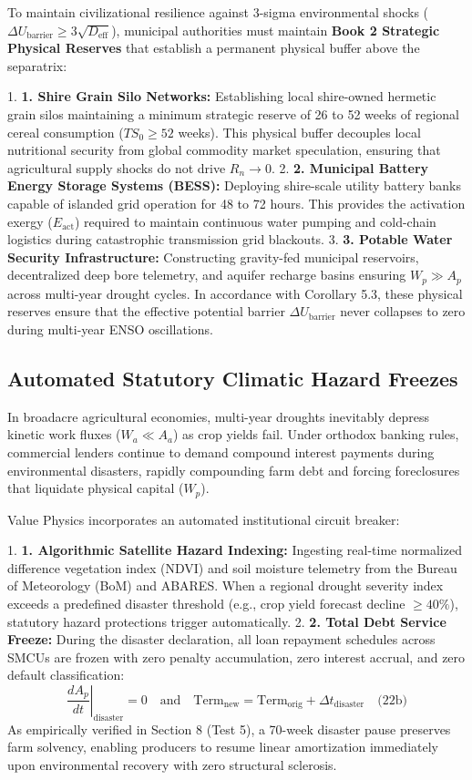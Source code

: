 \documentclass[preprint,12pt,authoryear]{elsarticle}
\theoremstyle{definition}
\begin{document}
To maintain civilizational resilience against 3-sigma environmental shocks ($\Delta U_{\text{barrier}} \ge 3 \sqrt{D_{\text{eff}}}$), municipal authorities must maintain \textbf{Book 2 Strategic Physical Reserves} that establish a permanent physical buffer above the separatrix:

1.  \textbf{1. Shire Grain Silo Networks:} Establishing local shire-owned hermetic grain silos maintaining a minimum strategic reserve of 26 to 52 weeks of regional cereal consumption ($TS_0 \ge 52$ weeks). This physical buffer decouples local nutritional security from global commodity market speculation, ensuring that agricultural supply shocks do not drive $R_n \to 0$.
2.  \textbf{2. Municipal Battery Energy Storage Systems (BESS):} Deploying shire-scale utility battery banks capable of islanded grid operation for 48 to 72 hours. This provides the activation exergy ($E_{\text{act}}$) required to maintain continuous water pumping and cold-chain logistics during catastrophic transmission grid blackouts.
3.  \textbf{3. Potable Water Security Infrastructure:} Constructing gravity-fed municipal reservoirs, decentralized deep bore telemetry, and aquifer recharge basins ensuring $W_p \gg A_p$ across multi-year drought cycles. In accordance with Corollary 5.3, these physical reserves ensure that the effective potential barrier $\Delta U_{\text{barrier}}$ never collapses to zero during multi-year ENSO oscillations.

\subsection{Automated Statutory Climatic Hazard Freezes}

In broadacre agricultural economies, multi-year droughts inevitably depress kinetic work fluxes ($W_a \ll A_a$) as crop yields fail. Under orthodox banking rules, commercial lenders continue to demand compound interest payments during environmental disasters, rapidly compounding farm debt and forcing foreclosures that liquidate physical capital ($W_p$).

Value Physics incorporates an automated institutional circuit breaker:

1.  \textbf{1. Algorithmic Satellite Hazard Indexing:} Ingesting real-time normalized difference vegetation index (NDVI) and soil moisture telemetry from the Bureau of Meteorology (BoM) and ABARES. When a regional drought severity index exceeds a predefined disaster threshold (e.g., crop yield forecast decline $\ge 40\%$), statutory hazard protections trigger automatically.
2.  \textbf{2. Total Debt Service Freeze:} During the disaster declaration, all loan repayment schedules across SMCUs are frozen with zero penalty accumulation, zero interest accrual, and zero default classification: $$\left. \frac{dA_p}{dt} \right|_{\text{disaster}} = 0 \quad \text{and} \quad \text{Term}_{\text{new}} = \text{Term}_{\text{orig}} + \Delta t_{\text{disaster}} \quad \text{(22b)}$$ As empirically verified in Section 8 (Test 5), a 70-week disaster pause preserves farm solvency, enabling producers to resume linear amortization immediately upon environmental recovery with zero structural sclerosis.
\end{document}

